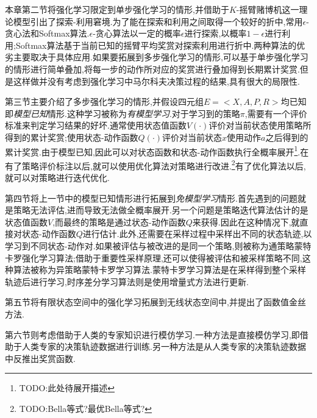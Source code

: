 本章第二节将强化学习限定到单步强化学习的情形,并借助于$K$-摇臂赌博机这一理论模型引出了探索-利用窘境.为了能在探索和利用之间取得一个较好的折中,常用$\epsilon$-贪心法和Softmax算法.$\epsilon$-贪心算法以一定的概率$\epsilon$进行探索,以概率$1-\epsilon$进行利用;Softmax算法基于当前已知的摇臂平均奖赏对探索利用进行折中.两种算法的优劣主要取决于具体应用.如果要拓展到多步强化学习的情形,可以基于单步强化学习的情形进行简单叠加,将每一步的动作所对应的奖赏进行叠加得到长期累计奖赏.但是这样做并没有考虑到强化学习中马尔科夫决策过程的结果,具有很大的局限性.

第三节主要介绍了多步强化学习的情形,并假设四元组$E=<X,A,P,R>$均已知即\textit{模型已知}情形.这种学习被称为\textit{有模型学习}.对于学习到的策略$\pi$,需要有一个评价标准来判定学习结果的好坏.通常使用状态值函数$V(\cdot)$评价对当前状态使用策略所得到的累计奖赏;使用状态-动作函数$Q(\cdot)$评价对当前状态$x$使用动作$a$之后得到的累计奖赏.由于模型已知,因此可以对状态函数和状态-动作函数执行全概率展开\footnote{TODO:此处待展开描述}.在有了策略评价标注以后,就可以使用优化算法对策略进行改进.\footnote{TODO:Bella等式?最优Bella等式?}有了优化算法以后,就可以对策略进行迭代优化.

第四节将上一节中的模型已知情形进行拓展到\textit{免模型学习}情形.首先遇到的问题就是策略无法评估,进而导致无法做全概率展开.另一个问题是策略迭代算法估计的是状态值函数$V$,而最终的策略是通过状态-动作函数$Q$来获得.因此在这种情况下,就直接对状态-动作函数$Q$进行估计.此外,还需要在采样过程中采样出不同的状态轨迹,以学习到不同状态-动作对.如果被评估与被改进的是同一个策略,则被称为通策略蒙特卡罗强化学习算法;借助于重要性采样原理,还可以使得被评估和被采样策略不同,这种算法被称为异策略蒙特卡罗学习算法.蒙特卡罗学习算法是在采样得到整个采样轨迹后进行学习,时序差分学习算法则是使用增量式方法进行更新.

第五节将有限状态空间中的强化学习拓展到无线状态空间中,并提出了函数值金丝方法.

第六节则考虑借助于人类的专家知识进行模仿学习.一种方法是直接模仿学习,即借助于人类专家的决策轨迹数据进行训练.另一种方法是从人类专家的决策轨迹数据中反推出奖赏函数.